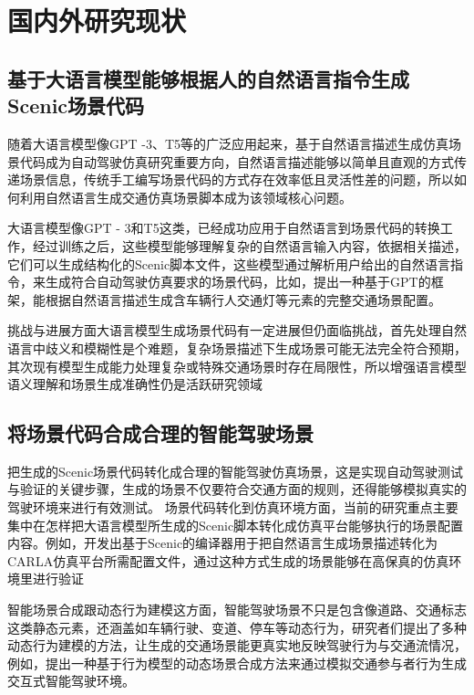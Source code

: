 	
\section{国内外研究现状}
\subsection{基于大语言模型能够根据人的自然语言指令生成Scenic场景代码}
随着大语言模型像GPT -3、T5等的广泛应用起来，基于自然语言描述生成仿真场景代码成为自动驾驶仿真研究重要方向，自然语言描述能够以简单且直观的方式传递场景信息\cite{klischat2020scenario}，传统手工编写场景代码的方式存在效率低且灵活性差的问题，所以如何利用自然语言生成交通仿真场景脚本成为该领域核心问题。
	
大语言模型像GPT - 3和T5这类\cite{Xu2023DriveGPT4}，已经成功应用于自然语言到场景代码的转换工作，经过训练之后，这些模型能够理解复杂的自然语言输入内容，依据相关描述，它们可以生成结构化的Scenic脚本文件\cite{scenario_runner_contributors2019carla}，这些模型通过解析用户给出的自然语言指令，来生成符合自动驾驶仿真要求的场景代码，比如，\cite{Chen et al. (2022)}提出一种基于GPT的框架，能根据自然语言描述生成含车辆行人交通灯等元素的完整交通场景配置。
	
挑战与进展方面大语言模型生成场景代码有一定进展但仍面临挑战，首先处理自然语言中歧义和模糊性是个难题，复杂场景描述下生成场景可能无法完全符合预期，其次现有模型生成能力处理复杂或特殊交通场景时存在局限性，所以增强语言模型语义理解和场景生成准确性仍是活跃研究领域
	
	\subsection{将场景代码合成合理的智能驾驶场景}
把生成的Scenic场景代码转化成合理的智能驾驶仿真场景，这是实现自动驾驶测试与验证的关键步骤，生成的场景不仅要符合交通方面的规则，还得能够模拟真实的驾驶环境来进行有效测试。
	场景代码转化到仿真环境方面，当前的研究重点主要集中在怎样把大语言模型所生成的Scenic脚本转化成仿真平台能够执行的场景配置内容。例如，\cite{Xie et al. (2021)}开发出基于Scenic的编译器用于把自然语言生成场景描述转化为CARLA仿真平台所需配置文件，通过这种方式生成的场景能够在高保真的仿真环境里进行验证
	
智能场景合成跟动态行为建模这方面，智能驾驶场景不只是包含像道路、交通标志这类静态元素，还涵盖如车辆行驶、变道、停车等动态行为，研究者们提出了多种动态行为建模的方法，让生成的交通场景能更真实地反映驾驶行为与交通流情况，例如，\cite{Zhao et al. (2020)}提出一种基于行为模型的动态场景合成方法来通过模拟交通参与者行为生成交互式智能驾驶环境。
	
